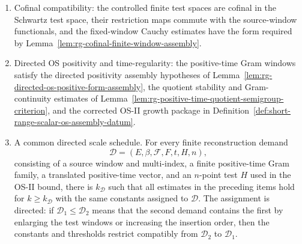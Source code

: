 \begin{definition}
\begin{enumerate}
  \eqref{eq:short-range-source-window-uniform-schwartz-bound}.  Consequently,
  for every multi-index \(\beta\) in the \(E\)-window,
  \begin{equation}
    \left|
      \partial_z^\beta W_{k,E}(0)-\partial_z^\beta W_{\ast,E}(0)
    \right|
    \le
    \frac{\beta!}{\rho_E^\beta}\,
    \epsilon^{\rm src}_{E,k}.
    \label{eq:short-range-rg-to-os-cumulant-budget}
  \end{equation}
  \item Cofinal compatibility: the controlled finite test spaces are cofinal
  in the Schwartz test space, their restriction maps commute with the
  source-window functionals, and the fixed-window Cauchy estimates have the
  form required by Lemma~\ref{lem:rg-cofinal-finite-window-assembly}.
  \item Directed OS positivity and time-regularity: the positive-time Gram
  windows satisfy the directed positivity assembly hypotheses of
  Lemma~\ref{lem:rg-directed-os-positive-form-assembly}, the quotient
  stability and Gram-continuity estimates of
  Lemma~\ref{lem:rg-positive-time-quotient-semigroup-criterion}, and the
  corrected OS-II growth package in
  Definition~\ref{def:short-range-scalar-os-assembly-datum}.
  \item A common directed scale schedule.  For every finite reconstruction
  demand
  \[
    \mathcal D=(E,\beta,\mathcal F,F,t,H,n),
  \]
  consisting of a source window and multi-index, a finite positive-time Gram
  family, a translated positive-time vector, and an \(n\)-point test \(H\)
  used in the OS-II bound, there is \(k_{\mathcal D}\) such that all estimates
  in the preceding items hold for \(k\ge k_{\mathcal D}\) with the same
  constants assigned to \(\mathcal D\).  The assignment is directed: if
  \(\mathcal D_1\leq\mathcal D_2\) means that the second demand contains the
  first by enlarging the test windows or increasing the insertion order, then
  the constants and thresholds restrict compatibly from
  \(\mathcal D_2\) to \(\mathcal D_1\).
\end{enumerate}
\end{definition}

